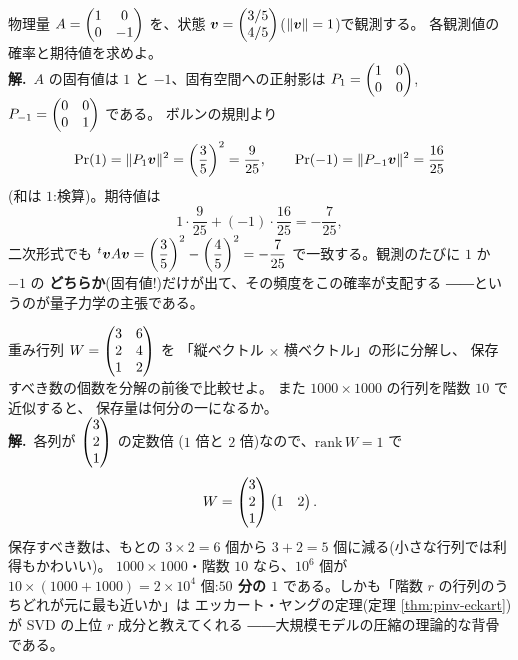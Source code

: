 \begin{rei}[例題・標準(観測確率と期待値)]\label{rei:final-std2}
物理量 $A = \begin{pmatrix}1 & 0 \\ 0 & -1\end{pmatrix}$ を、状態
$\bm{v} = \begin{pmatrix}3/5 \\ 4/5\end{pmatrix}$($\|\bm{v}\| = 1$)で観測する。
各観測値の確率と期待値を求めよ。\\
\textbf{解.}\ $A$ の固有値は $1$ と $-1$、固有空間への正射影は
$P_1 = \begin{pmatrix}1 & 0 \\ 0 & 0\end{pmatrix}$, $P_{-1} = \begin{pmatrix}0 & 0 \\ 0 & 1\end{pmatrix}$ である。
ボルンの規則より
\[
\Pr(1) = \|P_1\bm{v}\|^2 = \left(\frac{3}{5}\right)^2 = \frac{9}{25},
\qquad
\Pr(-1) = \|P_{-1}\bm{v}\|^2 = \frac{16}{25}
\]
(和は $1$:検算)。期待値は
\[
1 \cdot \frac{9}{25} + (-1) \cdot \frac{16}{25} = -\frac{7}{25},
\]
二次形式でも ${}^t\bm{v}A\bm{v}
= \left(\dfrac{3}{5}\right)^2 - \left(\dfrac{4}{5}\right)^2
= -\dfrac{7}{25}$ で一致する。観測のたびに $1$ か $-1$ の
\textbf{どちらか}(固有値!)だけが出て、その頻度をこの確率が支配する
――というのが量子力学の主張である。
\end{rei}

\begin{rei}[例題・標準(低ランク近似と圧縮率)]\label{rei:final-std3}
重み行列 $W = \begin{pmatrix}3 & 6 \\ 2 & 4 \\ 1 & 2\end{pmatrix}$ を
「縦ベクトル $\times$ 横ベクトル」の形に分解し、
保存すべき数の個数を分解の前後で比較せよ。
また $1000 \times 1000$ の行列を階数 $10$ で近似すると、
保存量は何分の一になるか。\\
\textbf{解.}\ 各列が $\begin{pmatrix}3 \\ 2 \\ 1\end{pmatrix}$ の定数倍
($1$ 倍と $2$ 倍)なので、$\mathrm{rank}\,W = 1$ で
\[
W = \begin{pmatrix}3 \\ 2 \\ 1\end{pmatrix}\begin{pmatrix}1 & 2\end{pmatrix}.
\]
保存すべき数は、もとの $3 \times 2 = 6$ 個から
$3 + 2 = 5$ 個に減る(小さな行列では利得もかわいい)。
$1000 \times 1000$・階数 $10$ なら、$10^6$ 個が
$10 \times (1000 + 1000) = 2 \times 10^4$ 個:\textbf{$50$ 分の $1$}
である。しかも「階数 $r$ の行列のうちどれが元に最も近いか」は
エッカート・ヤングの定理(定理 \ref{thm:pinv-eckart})が
SVD の上位 $r$ 成分と教えてくれる
――大規模モデルの圧縮の理論的な背骨である。
\end{rei}

